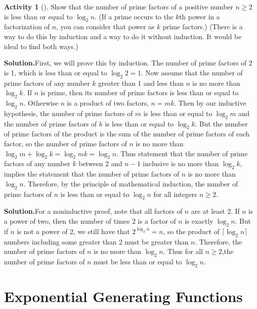 \documentclass[10pt,]{book}
\theoremstyle{plain}
\theoremstyle{definition}
\newtheorem{activity}[project]{Activity}
\numberwithin{equation}{chapter}
\begin{document}
\begin{activity}[]\label{activity-335}
Show that the number of prime factors of a positive number \(n\ge 2\) is less than or equal to \(\log_2 n\).  (If a prime occurs to the \(k\)th power in a factorization of \(n\), you can consider that power as \(k\) prime factors.)  (There is a way to do this by induction and a way to do it without induction.  It would be ideal to find both ways.)%
\par\medskip\noindent%
\textbf{Solution.}\quad First, we will prove this by induction. The number of prime factors of \(2\) is 1, which is less than or equal to \(\log_2 2=1\). Now assume that the number of prime factors of any number \(k\) greater than 1 and less than \(n\) is no more than \(\log_2 k\). If \(n\) is prime, then its number of prime factors is less than or equal to \(\log_2 n\). Otherwise \(n\) is a product of two factors, \(n=mk\). Then by our inductive hypothesis, the number of prime factors of \(m\) is less than or equal to \(\log_2 m\) and the number of prime factors of \(k\) is less than or equal to \(\log_2 k\). But the number of prime factors of the product is the sum of the number of prime factors of each factor, so the number of prime factors of \(n\) is no more than \(\log_2 m +\log_2 k=\log_2 mk= \log_2 n\). Thus statement that the number of prime factors of any number \(k\) between 2 and \(n-1\) inclusive is no more than \(\log_2 k\), implies the statement that the number of prime factors of \(n\) is no more than \(\log_2 n\). Therefore, by the principle of mathematical induction, the number of prime factors of \(n\) is less than or equal to \(\log_2 n\) for all integers \(n\ge 2\).%
\par\medskip\noindent%
\textbf{Solution.}\quad For a noninductive proof, note that all factors of \(n\) are at least 2. If \(n\) is a power of two, then the number of times \(2\) is a factor of \(n\) is exactly \(\log_2 n\). But if \(n\) is not a power of 2, we still have that \(2^{\log_2 n}=n\), so the product of \(\lceil\log_2 n\rceil\) numbers including some greater than 2 must be greater than \(n\). Therefore, the number of prime factors of \(n\) is no more than \(\log_2 n\). Thus for all \(n\ge2\),the number of prime factors of \(n\) must be less than or equal to \(\log_2 n\).%
\end{activity}
%
\backmatter
%
\typeout{************************************************}
\typeout{************************************************}
\chapter[{Exponential Generating Functions}]{Exponential Generating Functions}\label{expogenfun}
\typeout{************************************************}
\typeout{************************************************}
\end{document}

